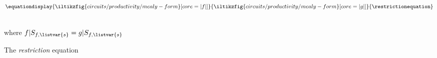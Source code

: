 \begin{figure}
    \centering
    \(\equationdisplay{
        \iltikzfig{circuits/productivity/mealy-form}[core=|f|]
    }{
        \iltikzfig{circuits/productivity/mealy-form}[core=|g|]
    }{\restrictionequation}\)
    \,\,
    \begin{minipage}{0.25\textwidth}
        \centering
        where \(f|S_{f,\listvar{s}} = g|S_{f,\listvar{s}}\)
    \end{minipage}
    \caption{The \emph{restriction} equation}
    \label{fig:restriction-equations}
\end{figure}